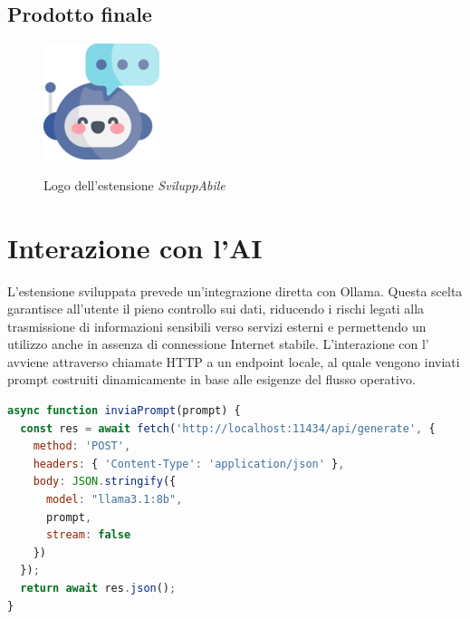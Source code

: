\subsection{Prodotto finale}

\begin{figure}[H]
    \centering
    \includegraphics[width=0.15\linewidth, alt={Logo dell'estensione \textit{SviluppAbile}}]{img/sviluppabile.png}
    \caption{Logo dell'estensione \textit{SviluppAbile}}\label{fig:logo_sviluppabile}
\end{figure}


\section{Interazione con l'AI}
\noindent L’estensione sviluppata prevede un’integrazione diretta con Ollama. Questa scelta garantisce all’utente il pieno controllo sui dati, riducendo i rischi legati alla trasmissione di informazioni sensibili verso servizi esterni e permettendo un utilizzo anche in assenza di connessione Internet stabile. L’interazione con l’ avviene attraverso chiamate HTTP a un endpoint locale, al quale vengono inviati prompt costruiti dinamicamente in base alle esigenze del flusso operativo.

\begin{lstlisting}[language=JavaScript, caption={Funzione di interazione con Ollama}]
async function inviaPrompt(prompt) {
  const res = await fetch('http://localhost:11434/api/generate', {
    method: 'POST',
    headers: { 'Content-Type': 'application/json' },
    body: JSON.stringify({
      model: "llama3.1:8b",
      prompt,
      stream: false
    })
  });
  return await res.json();
}
\end{lstlisting}


